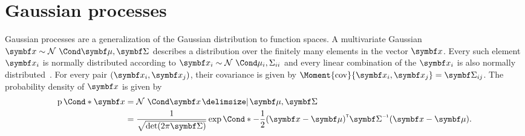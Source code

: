 \section{Gaussian processes}
Gaussian processes are a generalization of the Gaussian distribution to function spaces.
A multivariate Gaussian $\mat{x} \sim \Gaussian{\mat{\mu}, \mat{\Sigma}}$ describes a distribution over the finitely many elements in the vector $\mat{x}$.
Every such element $\rv{x}_i$ is normally distributed according to $\rv{x}_i \sim \Gaussian{\mu_i, \Sigma_{ii}}$ and every linear combination of the $\mat{x}_i$ is also normally distributed~\parencite{astrom_introduction_1971}.
For every pair $(\rv{x}_i, \rv{x}_j)$, their covariance is given by $\Moment{\cov}{\rv{x}_i, \rv{x}_j} = \mat{\Sigma}_{ij}$.
The probability density of $\mat{x}$ is given by
\begin{equation}
    \begin{split}
        \label{eq:gaussian_pdf}
        \Prob*{\mat{x}}
        &= \Gaussian{\mat{x} \given \mat{\mu}, \mat{\Sigma}} \\
        &= \frac{1}{\sqrt{\det(2\pi\mat{\Sigma})}}\Fun*{\exp}{-\frac{1}{2}(\mat{x} - \mat{\mu})\tran \mat{\Sigma}\inv (\mat{x} - \mat{\mu})}.
    \end{split}
\end{equation}

